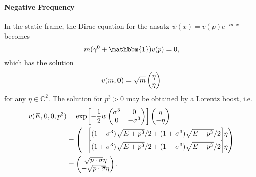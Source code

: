 \documentclass{article}
\begin{document}
\paragraph*{Negative Frequency}
In the static frame, the Dirac equation for the ansatz $\psi(x) = v(p) e^{+ip\cdot x}$ becomes
\[ m(\gamma^0 + \mathbbm{1}) v(p) = 0, \]
which has the solution
\[ v(m,\vb{0}) = \sqrt{m} \begin{pmatrix}
    \eta \\ \eta
\end{pmatrix} \]
for any $\eta \in \mathbb{C}^2$.
The solution for $p^3>0$ may be obtained by a Lorentz boost, i.e.
\begin{align*}
    v(E,0,0,p^3) &= \exp[-\frac{1}{2}w\begin{pmatrix}
        \sigma^3 & 0 \\
        0 & -\sigma^3
    \end{pmatrix}] \begin{pmatrix}
        \eta \\ -\eta
    \end{pmatrix} \\
    &= \begin{pmatrix}
        \phantom{-}\qty[(1-\sigma^3)\sqrt{E+p^3}/2+(1+\sigma^3)\sqrt{E-p^3}/2] \eta \\
        -\qty[(1+\sigma^3)\sqrt{E+p^3}/2+(1-\sigma^3)\sqrt{E-p^3}/2] \eta
    \end{pmatrix} \\
    &= \begin{pmatrix}
        \sqrt{p\cdot \sigma} \eta \\
        -\sqrt{p\cdot \overline{\sigma}} \eta
    \end{pmatrix}.
\end{align*}
\end{document}
